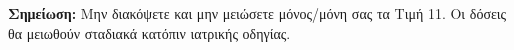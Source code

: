 \documentclass[10pt,greek]{article}
\begin{document}
\begin{MedTable}
\end{MedTable}

\textbf{Σημείωση:} Μην διακόψετε και μην μειώσετε μόνος/μόνη σας τα Τιμή 11. Οι δόσεις θα μειωθούν σταδιακά κατόπιν ιατρικής οδηγίας.
\end{document}
